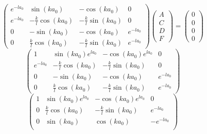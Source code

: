 \documentclass[12pt]{article}
\begin{document}
\begin{enumerate}
          \[
              \begin{pmatrix}
                  e^{- l a_0} & \sin{(k a_0)}               & -\cos{(k a_0)}             & 0           \\
                  e^{- l a_0} & - \frac{k}{l} \cos{(k a_0)} & - \frac{k}{l}\sin{(k a_0)} & 0           \\
                  0           & - \sin{(k a_0)}             & - \cos{(k a_0)}            & e^{- l a_0} \\
                  0           & \frac{k}{l}  \cos{(k a_0)}  & -\frac{k}{l} \sin{(k a_0)} & e^{- l a_0}
              \end{pmatrix}
              \begin{pmatrix}
                  A \\
                  C \\
                  D \\
                  F
              \end{pmatrix} =
              \begin{pmatrix}
                  0 \\
                  0 \\
                  0 \\
                  0
              \end{pmatrix}
          \]
          \[
              \begin{pmatrix}
                  1           & \sin{(k a_0)}e^{l a_0}      & -\cos{(k a_0)}e^{l a_0}    & 0           \\
                  e^{- l a_0} & - \frac{k}{l} \cos{(k a_0)} & - \frac{k}{l}\sin{(k a_0)} & 0           \\
                  0           & - \sin{(k a_0)}             & - \cos{(k a_0)}            & e^{- l a_0} \\
                  0           & \frac{k}{l}  \cos{(k a_0)}  & -\frac{k}{l} \sin{(k a_0)} & e^{- l a_0}
              \end{pmatrix}
          \]
          \[
              \begin{pmatrix}
                  1 & \sin{(k a_0)}e^{l a_0}                    & -\cos{(k a_0)}e^{l a_0}                  & 0             \\
                  0 & \frac{k}{l}  \cos{(k a_0)}                & -\frac{k}{l} \sin{(k a_0)}               & e^{- l a_0}   \\
                  0 & \sin{(k a_0)}                             & \cos{(k a_0)}                            & - e^{- l a_0} \\

\end{pmatrix}\]
\end{enumerate}
\end{document}
